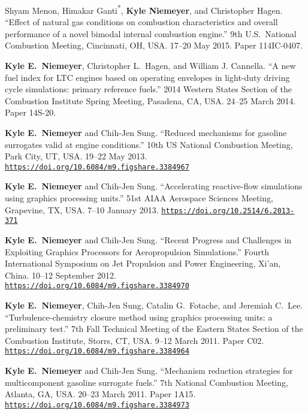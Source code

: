 \documentclass[margin,line,11pt]{res}
\makeatletter
\newlength{\bibhang}
\newlength{\bibsep}
 {\@listi \global\bibsep\itemsep \global\advance\bibsep by\parsep}
\newenvironment{bibenum*}
  {\renewcommand\labelenumi{\theenumi.}%
   \etaremune[
     topsep=0pt,
     itemsep=\bibsep,
     parsep=0pt,partopsep=0pt,
     itemindent=-\bibhang,
     leftmargin={\bibhang+\widthof{[999]}}]}
  {\endetaremune}
\newcommand*{\doi}[1]{\href{https://doi.org/#1}{\nolinkurl{https://doi.org/#1}}}
\newcommand*{\grad}[0]{\textsuperscript{*}}
\makeatother
\begin{document}
\begin{resume}
\begin{bibenum*}
\item Shyam Menon, Himakar Ganti\grad{}, \textbf{Kyle Niemeyer}, and Christopher Hagen.
``Effect of natural gas conditions on combustion characteristics and overall performance of a novel bimodal internal combustion engine.''
9th U.S.~National Combustion Meeting, Cincinnati, OH, USA.
17--20 May 2015.
Paper 114IC-0407.

\item \textbf{Kyle E.~Niemeyer}, Christopher L.\ Hagen, and William J. Cannella.
``A new fuel index for LTC engines based on operating envelopes in light-duty driving cycle simulations: primary reference fuels.''
2014 Western States Section of the Combustion Institute Spring Meeting, Pasadena, CA, USA.
24--25 March 2014.
Paper 14S-20.

\item \textbf{Kyle E.~Niemeyer} and Chih-Jen Sung.
``Reduced mechanisms for gasoline surrogates valid at engine conditions.''
10th US National Combustion Meeting, Park City, UT, USA.
19--22 May 2013.
\doi{10.6084/m9.figshare.3384967}

\item \textbf{Kyle E.~Niemeyer} and Chih-Jen Sung.
``Accelerating reactive-flow simulations using graphics processing units.''
51st AIAA Aerospace Sciences Meeting, Grapevine, TX, USA.
7--10 January 2013.
\doi{10.2514/6.2013-371}

\item \textbf{Kyle E.~Niemeyer} and Chih-Jen Sung.
``Recent Progress and Challenges in Exploiting Graphics Processors for Aeropropulsion Simulations.''
Fourth International Symposium on Jet Propulsion and Power Engineering, Xi'an, China.
10--12 September 2012. \\
\doi{10.6084/m9.figshare.3384970}

\item \textbf{Kyle E.~Niemeyer}, Chih-Jen Sung, Catalin G.\ Fotache, and Jeremiah C.\ Lee.
``Turbulence-chemistry closure method using graphics processing units: a preliminary test.''
7th Fall Technical Meeting of the Eastern States Section of the Combustion Institute, Storrs, CT, USA.
9--12 March 2011.
Paper C02.
\doi{10.6084/m9.figshare.3384964}

\item \textbf{Kyle E.~Niemeyer} and Chih-Jen Sung.
``Mechanism reduction strategies for multicomponent gasoline surrogate fuels.''
7th National Combustion Meeting, Atlanta, GA, USA.
20--23 March 2011.
Paper 1A15.
\doi{10.6084/m9.figshare.3384973}


\end{bibenum*}
\end{resume}
\end{document}
